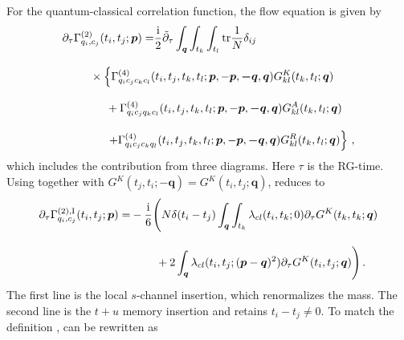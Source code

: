 \documentclass[reprint,english,superscriptaddress,preprintnumbers,amsmath,amssymb,aps,prd]{revtex4-1}
\begin{document}
For the quantum-classical correlation function, the flow equation is given by
\begin{align}
    \partial_{\tau}\Gamma_{q_i,c_j}^{(2)}(t_i,t_j;\boldsymbol{p})=&\frac{\mathrm{i}}{2}\tilde{\partial}_{\tau}\int_{\boldsymbol{q}}\int_{t_k}\int_{t_l}\mathrm{tr}\frac{1}{N}\delta_{ij}\nonumber\\[2ex]&\hspace{-2cm}\times\left\{\Gamma_{q_{i}c_{j}c_{k}c_{l}}^{(4)}(t_i,t_j,t_k,t_l;\boldsymbol{p},-\boldsymbol{p},\boldsymbol{-q},\boldsymbol{q})G^{K}_{kl}(t_k,t_l;\boldsymbol{q})\right.\label{eq:qc-1}\\[2ex]
    &\hspace{-1.5cm}+\Gamma_{q_{i}c_{j}q_{k}c_{l}}^{(4)}(t_i,t_j,t_k,t_l;\boldsymbol{p},-\boldsymbol{p},\boldsymbol{-q},\boldsymbol{q})G^{A}_{kl}(t_k,t_l;\boldsymbol{q})\label{eq:qc-2}\\[2ex]
    &\left.\hspace{-1.5cm}+\Gamma_{q_{i}c_{j}c_{k}q_{l}}^{(4)}(t_i,t_j,t_k,t_l;\boldsymbol{p},-\boldsymbol{p},\boldsymbol{-q},\boldsymbol{q})G^{R}_{kl}(t_k,t_l;\boldsymbol{q})\right\}\,,\label{eq:qc-3}
\end{align}
which includes the contribution from three diagrams. Here $\tau$ is the RG-time. Using  together with $G^{K}(t_j,t_i;-\boldsymbol{q})=G^{K}(t_i,t_j;\boldsymbol{q})$,  reduces to
\begin{align}
    \partial_{\tau}\Gamma_{q_i,c_j}^{(2),\mathrm{I}}(t_i,t_j;\boldsymbol{p})=&-\frac{\mathrm{i}}{6}\Bigg(N\delta(t_i-t_j)\int_{\boldsymbol{q}}\int_{t_k}\lambda_{cl}(t_i,t_k;0)\partial_{\tau}G^{K}(t_k,t_k;\boldsymbol{q})\nonumber\\[2ex]
    &\hspace{0.8cm}+2\int_{\boldsymbol{q}}\lambda_{cl}(t_i,t_j;(\boldsymbol{p}-\boldsymbol{q})^2)\partial_{\tau}G^{K}(t_i,t_j;\boldsymbol{q})\Bigg)\,.\label{eq:qc-I}
\end{align}
The first line is the local $s$-channel insertion, which renormalizes the mass. The second line is the $t+u$ memory insertion and retains $t_i-t_j\neq 0$. To match the definition ,  can be rewritten as
\end{document}
